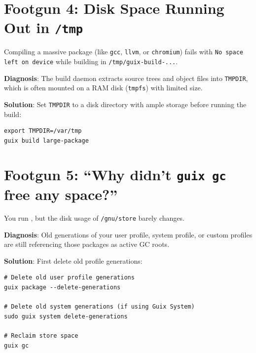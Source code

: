 \section{Footgun 4: Disk Space Running Out in \texttt{/tmp}}

\begin{tcolorbox}[colback=footgunred!5!white,colframe=footgunred,title=Symptom]
Compiling a massive package (like \texttt{gcc}, \texttt{llvm}, or \texttt{chromium}) fails with \texttt{No space left on device} while building in \texttt{/tmp/guix-build-...}.
\end{tcolorbox}

\textbf{Diagnosis}: The build daemon extracts source trees and object files into \texttt{TMPDIR}, which is often mounted on a RAM disk (\texttt{tmpfs}) with limited size.

\textbf{Solution}: Set \texttt{TMPDIR} to a disk directory with ample storage before running the build:
\begin{lstlisting}[style=guixcli]
export TMPDIR=/var/tmp
guix build large-package
\end{lstlisting}

\section{Footgun 5: ``Why didn't \texttt{guix gc} free any space?''}

\begin{tcolorbox}[colback=footgunred!5!white,colframe=footgunred,title=Symptom]
You run , but the disk usage of \texttt{/gnu/store} barely changes.
\end{tcolorbox}

\textbf{Diagnosis}: Old generations of your user profile, system profile, or custom profiles are still referencing those packages as active GC roots.

\textbf{Solution}: First delete old profile generations:
\begin{lstlisting}[style=guixcli]
# Delete old user profile generations
guix package --delete-generations

# Delete old system generations (if using Guix System)
sudo guix system delete-generations

# Reclaim store space
guix gc
\end{lstlisting}
